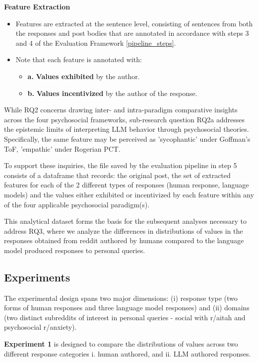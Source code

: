 \medskip 
\textbf{Feature Extraction}

\smallskip 
\begin{itemize}
    \item Features are extracted at the sentence level, consisting of sentences from both the responses and post bodies that are annotated in accordance with steps 3 and 4 of the Evaluation Framework \ref{pipeline_steps}.
    \item Note that each feature is annotated with:
    \begin{itemize}
        \item \textbf{a.} \textbf{Values exhibited} by the author.
        \item \textbf{b.} \textbf{Values incentivized} by the author of the response.
    \end{itemize}
\end{itemize}

While RQ2 concerns drawing inter- and intra-paradigm comparative insights across the four psychosocial frameworks, sub-research question RQ2a addresses the epistemic limits of interpreting LLM behavior through psychosocial theories. Specifically, the same feature may be perceived as 'sycophantic' under Goffman’s ToF, 'empathic' under Rogerian PCT.

To support these inquiries, the file saved by the evaluation pipeline in step 5 consists of a dataframe that records: the original post, the set of extracted features for each of the 2 different types of responses (human response, language models) and the values either exhibited or incentivized by each feature within any of the four applicable psychosocial paradigm(s).

This analytical dataset forms the basis for the subsequent analyses necessary to address RQ3, where we analyze the differences in distributions of values in the responses obtained from reddit authored by humans compared to the language model produced responses to personal queries.

\subsection{Experiments}
The experimental design spans two major dimensions: (i) response type (two forms of human responses and three language model responses) and (ii) domains (two distinct subreddits of interest in personal queries - social with r/aitah and psychosocial r/anxiety).

\textbf{Experiment 1} is designed to compare the distributions of values across two different response categories i. human authored, and ii. LLM authored responses. 

